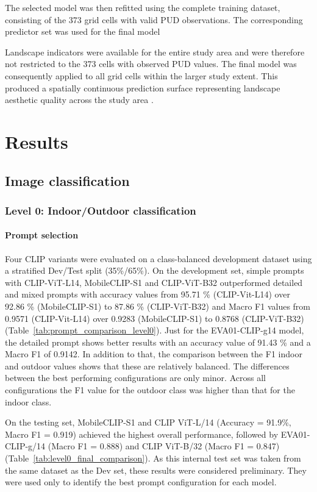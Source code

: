 \documentclass[11pt]{article}
\renewcommand{\_}{\textunderscore\allowbreak{}}
\begin{document}
The selected model was then refitted using the complete training dataset, consisting of the 373 grid cells with valid PUD observations. The corresponding predictor set was used for the final model

Landscape indicators were available for the entire study area and were therefore not restricted to the 373 cells with observed PUD values. The final model was consequently applied to all grid cells within the larger study extent. This produced a spatially continuous prediction surface representing landscape aesthetic quality across the study area \citep{guisan2000predictive}.


\section{Results}

\subsection{Image classification}

\subsubsection{Level 0: Indoor/Outdoor classification}

\paragraph{Prompt selection}

Four CLIP variants were evaluated on a class-balanced development dataset using a stratified Dev/Test split (35\%/65\%). On the development set, simple prompts with CLIP-ViT-L14, MobileCLIP-S1 and CLIP-ViT-B32 outperformed detailed and mixed prompts with accuracy values from 95.71 \% (CLIP-Vit-L14) over 92.86 \% (MobileCLIP-S1) to 87.86 \% (CLIP-ViT-B32) and Macro F1 values from 0.9571 (CLIP-Vit-L14) over 0.9283 (MobileCLIP-S1) to 0.8768 (CLIP-ViT-B32) (Table~\ref{tab:prompt_comparison_level0}). Just for the EVA01-CLIP-g14 model, the detailed prompt shows better results with an accuracy value of 91.43 \% and a Macro F1 of 0.9142. In addition to that, the comparison between the F1 indoor and outdoor values shows that these are relatively balanced. The differences between the best performing configurations are only minor. Across all configurations the F1 value for the outdoor class was higher than that for the indoor class. 

On the testing set, MobileCLIP-S1 and CLIP ViT-L/14 (Accuracy = 91.9\%, Macro F1 = 0.919) achieved the highest overall performance, followed by EVA01-CLIP-g/14 (Macro F1 = 0.888) and CLIP ViT-B/32 (Macro F1 = 0.847) (Table~\ref{tab:level0_final_comparison}). As this internal test set was taken from the same dataset as the Dev set, these results were considered preliminary. They were used only to identify the best prompt configuration for each model. 
\end{document}
